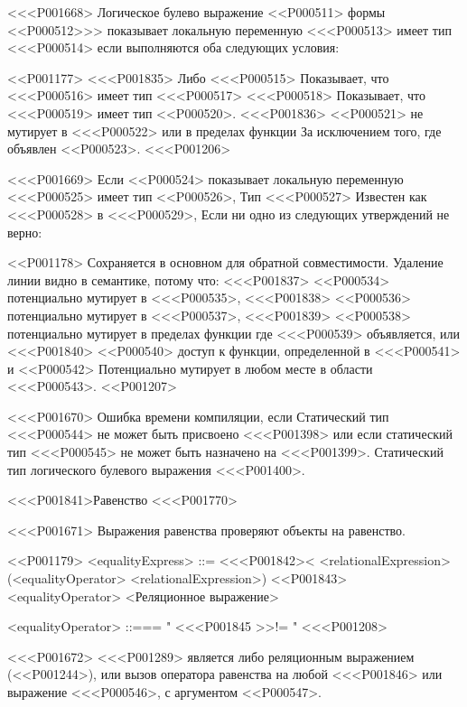 {{{{{{{{<<<P001668>%
Логическое булево выражение <<P000511> формы <<P000512>>>
показывает локальную переменную <<<P000513> имеет тип <<<P000514>
если выполняются оба следующих условия:

<<P001177>
<<<P001835> Либо <<<P000515> Показывает, что <<<P000516> имеет тип <<<P000517>
<<<P000518> Показывает, что <<<P000519> имеет тип <<P000520>.
<<<P001836> <<P000521> не мутирует в <<<P000522> или в пределах функции
За исключением того, где объявлен <<P000523>.
<<<P001206>

<<<P001669>%
Если <<P000524> показывает локальную переменную <<<P000525> имеет тип <<P000526>,
Тип <<<P000527> Известен как <<<P000528> в <<<P000529>,
Если ни одно из следующих утверждений не верно:

<<P001178>
Сохраняется в основном для обратной совместимости.
Удаление линии видно в семантике, потому что:
<<<P001837> <<P000534> потенциально мутирует в <<<P000535>,
<<<P001838> <<P000536> потенциально мутирует в <<<P000537>,
<<<P001839> <<P000538> потенциально мутирует в пределах функции
где <<<P000539> объявляется, или
<<<P001840> <<P000540> доступ к функции, определенной в <<<P000541> и
<<P000542> Потенциально мутирует в любом месте в области <<<P000543>.
<<P001207>

<<<P001670>%
Ошибка времени компиляции, если
Статический тип <<<P000544> не может быть присвоено <<<P001398>
или если статический тип <<<P000545> не может быть назначено на <<<P001399>.
Статический тип логического булевого выражения <<<P001400>.


<<<P001841>{Равенство}
<<<P001770>

<<<P001671>%
Выражения равенства проверяют объекты на равенство.

<<P001179>
<equalityExpress> ::= <<<P001842><
<relationalExpression> (<equalityOperator> <relationalExpression>)
<<P001843> \SUPER{}<equalityOperator> <Реляционное выражение>

<equalityOperator> ::=== "
<<<P001845 >>!= "
<<<P001208>

<<<P001672>%
<<<P001289> является либо реляционным выражением
(<<P001244>),
или вызов оператора равенства на любой <<<P001846>
или выражение <<<P000546>, с аргументом <<P000547>.

}}}}}}}}
